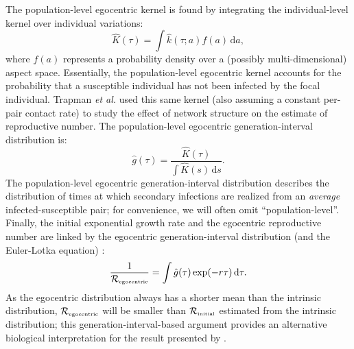 \documentclass[12pt]{article}
\newcommand{\Rx}[1]{\ensuremath{{\mathcal R}_{#1}}\xspace}
\newcommand{\RR}{\ensuremath{{\mathcal R}}}
\newcommand{\Rini}{\Rx{\textrm{\tiny initial}}}
\newcommand{\Rego}{\Rx{\textrm{\tiny egocentric}}}
\newcommand{\Rhat}{\ensuremath{{\hat\RR}}}
\begin{document}
The population-level egocentric kernel is found by integrating the individual-level kernel over individual variations:
\begin{equation}\label{eq:ego}
\hat{K}(\tau) = \int \hat{k}(\tau; a) f(a) \,\mathrm{d}a,
\end{equation}
where $f(a)$ represents a probability density over a (possibly multi-dimensional) aspect space.
Essentially, the population-level egocentric kernel accounts for the probability that a susceptible individual has not been infected by the focal individual.
Trapman \textit{et al.} \cite{trapman2016inferring} used this same kernel (also assuming a constant per-pair contact rate) to study the effect of network structure on the estimate of reproductive number.
The population-level egocentric generation-interval distribution is:
\begin{equation}
\hat{g}(\tau) = \frac{\hat{K}(\tau)}{\int \hat{K}(s)\,\mathrm{d}s}.
\label{eq:conditional}
\end{equation}
The population-level egocentric generation-interval distribution describes the distribution of times at which secondary infections are realized from an \emph{average} infected-susceptible pair; for convenience, we will often omit ``population-level''.
Finally, the initial exponential growth rate and the egocentric reproductive number are linked by the egocentric generation-interval distribution (and the Euler-Lotka equation) \citep{trapman2016inferring}:
\begin{equation}
\frac{1}{\Rego} = \int \hat{g}(\tau) \exp(-r \tau)\,\mathrm{d}\tau.
\label{eq:egorR}
\end{equation}
As the egocentric distribution always has a shorter mean than the intrinsic distribution, $\Rego$ will be smaller than $\Rini$ estimated from the intrinsic distribution;
this generation-interval-based argument provides an alternative biological interpretation for the result presented by \cite{trapman2016inferring}.
\end{document}
